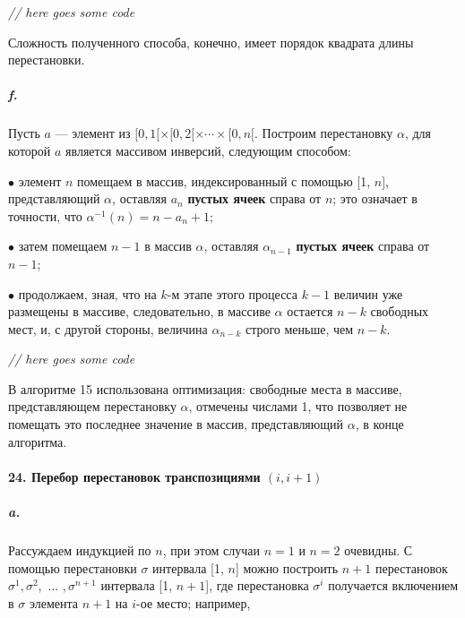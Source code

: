 \documentclass{../../template/mai_book}
\begin{document}
\textit{// here goes some code} \newline

Сложность полученного способа, конечно, имеет порядок квадрата длины перестановки.

\newpage


\subparagraph{f.} Пусть $a$ — элемент из $[0, 1[ \times [0, 2[ \times \cdots \times [0, n[$. Построим перестановку $\alpha$, для которой $a$ является массивом инверсий, следующим способом: \newline

$\bullet$ элемент $n$ помещаем в массив, индексированный с помощью [1, $n$], представляющий $\alpha$, оставляя $a_n$ \textbf{пустых ячеек} справа от $n$; это означает в точности, что $\alpha^{-1}(n) = n - a_n + 1$;

$\bullet$ затем помещаем $n - 1$ в массив $\alpha$, оставляя $\alpha_{n - 1}$ \textbf{пустых ячеек} справа от $n - 1$;

$\bullet$ продолжаем, зная, что на $k$-м этапе этого процесса $k - 1$ величин уже размещены в массиве, следовательно, в массиве $\alpha$ остается $n - k$ свободных мест, и, с другой стороны, величина $\alpha_{n - k}$ строго меньше, чем $n - k$. \newline

\textit{// here goes some code} \newline

В алгоритме 15 использована оптимизация: свободные места в массиве, представляющем перестановку $\alpha$, отмечены числами 1, что позволяет не помещать это последнее значение в массив, представляющий $\alpha$, в конце алгоритма.

\paragraph{24. Перебор перестановок транспозициями $(i, i + 1)$}

\subparagraph{a.} Рассуждаем индукцией по $n$, при этом случаи $n = 1$ и $n = 2$ очевидны. С помощью перестановки $\sigma$ интервала [1, $n$] можно построить $n + 1$ перестановок $\sigma^1, \sigma^2, \text{ ... } , \sigma^{n + 1}$ интервала [1, $n + 1$], где перестановка $\sigma^i$ получается включением в $\sigma$ элемента $n + 1$ на $i$-ое место; например,

\newpage

\end{document}
